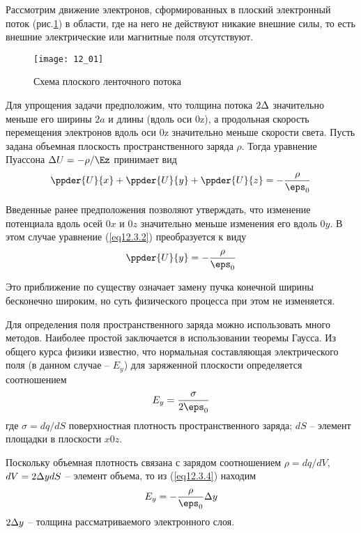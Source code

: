 
Рассмотрим движение электронов, сформированных в плоский электронный поток 
(рис.\ref{img12.1}) в области, где на него не действуют никакие внешние силы, 
то есть внешние электрические или магнитные поля отсутствуют.

\begin{figure}[h!]
	\center
	\texttt{[image: 12\_01]}
	\caption{Схема плоского ленточного потока}
	\label{img12.1}
\end{figure}

Для упрощения задачи предположим, что толщина потока \( 2\Delta \) значительно 
меньше его ширины \( 2a \) и длины (вдоль оси 0z), а продольная скорость 
перемещения электронов вдоль оси 0z значительно меньше скорости света. Пусть 
задана объемная плоскость пространственного заряда \( \rho \). Тогда уравнение 
Пуассона \( \D U = -\rho / \Ez \) принимает вид
\begin{equation}
	\ppder{U}{x} + \ppder{U}{y} + \ppder{U}{z} = -\frac{\rho}{\eps_0}
	\label{eq12.3.2}
\end{equation}

Введенные ранее предположения позволяют утверждать, что изменение потенциала 
вдоль осей \( 0x \) и \( 0z \) значительно меньше изменения его вдоль 
\( 0y \). В этом случае уравнение (\ref{eq12.3.2}) преобразуется к виду
\begin{equation}
	\ppder{U}{y} = -\frac{\rho}{\eps_0}
	\label{eq12.3.3}
\end{equation}
 
Это приближение по существу означает замену пучка конечной ширины бесконечно 
широким, но суть физического процесса при этом не изменяется.

Для определения поля пространственного заряда можно использовать много 
методов. Наиболее простой заключается в использовании теоремы Гаусса. Из 
общего курса физики известно, что нормальная составляющая электрического поля 
(в данном случае -- \( E_y \)) для заряженной плоскости определяется
соотношением
\begin{equation}
	E_y = \frac{\sigma}{2\eps_0}
	\label{eq12.3.4}
\end{equation}
где \( \sigma = dq/dS \) поверхностная плотность пространственного заряда;
\( dS \) -- элемент площадки в плоскости \( x0z \).

Поскольку объемная плотность связана с зарядом соотношением 
\( \rho = dq/dV \), \( dV = 2\Delta ydS \) -- элемент объема, то из 
(\ref{eq12.3.4}) находим
\begin{equation}
	E_y = -\frac{\rho}{\eps_0}\D y
	\label{eq12.3.5}
\end{equation}
\( 2\Delta y \) -- толщина рассматриваемого электронного слоя.

